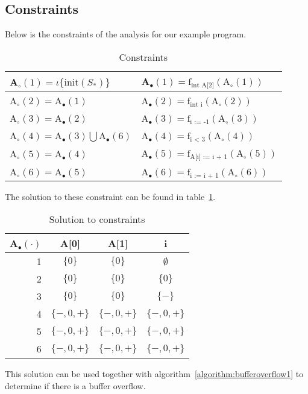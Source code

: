 \subsection{Constraints}
Below is the constraints of the analysis for our example program.
\begin{table}[H]
\begin{tabular}{| l | l |}
\hline
A$_\circ (1) = \iota \{\text{init}(S_*) \} $ & A$_\bullet(1) = \text{f}_{\text{int A[2]}} (\text{A}_\circ (1))$ \\
\hline
A$_\circ (2) =$A$_\bullet(1) $ & A$_\bullet(2) = \text{f}_{\text{int i}} (\text{A}_\circ (2))$ \\
\hline
A$_\circ (3) = $A$_\bullet(2)$ & A$_\bullet(3) = \text{f}_{\text{i := -1}} (\text{A}_\circ (3))$  \\
\hline
A$_\circ (4) = $A$_\bullet(3) \bigcup $A$_\bullet(6) $ & A$_\bullet(4) = \text{f}_{\text{i < 3}} (\text{A}_\circ (4))$ \\
\hline
A$_\circ (5) = $A$_\bullet(4)$ & A$_\bullet(5) = \text{f}_{\text{A[i] := i + 1}} (\text{A}_\circ (5))$ \\
\hline
A$_\circ (6) = $A$_\bullet(5)$ & A$_\bullet(6) = \text{f}_{\text{i := i + 1}} (\text{A}_\circ (6))$ \\

\hline
\end{tabular}
\centering
\caption{Constraints}
\end{table}

The solution to these constraint can be found in table~\ref{table:bufferoverflowsolution1}.

\begin{table}[H]
\begin{tabular}{| r | c | c | c |}
\hline
A$_\bullet (\cdot) $ & A[0]        & A[1]        & i \\
\hline
1                    & $\{0\}$     & $\{0\} $    & $\emptyset$ \\
2                    & $\{0\}$     & $\{0\} $    & $\{0\}$ \\
3                    & $\{0\}$     & $\{0\} $    & $\{-\}$ \\
4                    & $\{-,0,+\}$ & $\{-,0,+\}$ & $\{-,0,+\}$ \\
5                    & $\{-,0,+\}$ & $\{-,0,+\}$ & $\{-,0,+\}$ \\
6                    & $\{-,0,+\}$ & $\{-,0,+\}$ & $\{-,0,+\}$ \\
\hline
\end{tabular}
\centering
\caption{Solution to constraints}
\label{table:bufferoverflowsolution1}
\end{table}
This solution can be used together with algorithm~\ref{algorithm:bufferoverflow1} to determine if there is a buffer overflow.
